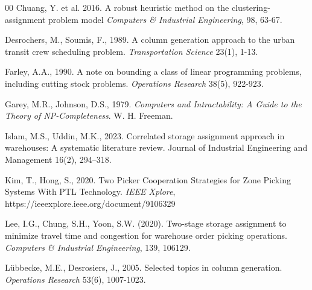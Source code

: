 \documentclass[preprint,review,11pt,authoryear]{elsarticle}
\begin{document}
\begin{thebibliography}{00}
Chuang, Y. et al. 2016. A robust heuristic method on the clustering-assignment problem model
\textit{Computers \& Industrial Engineering}, 98, 63-67.


Desrochers, M., Soumis, F., 1989. A column generation approach to the urban transit crew scheduling problem. \textit{Transportation Science} 23(1), 1-13.


Farley, A.A., 1990. A note on bounding a class of linear programming problems, including cutting stock problems. \textit{Operations Research} 38(5), 922-923.

Garey, M.R., Johnson, D.S., 1979. \textit{Computers and Intractability: A Guide to the Theory of NP-Completeness}. W. H. Freeman.

Islam, M.S., Uddin, M.K., 2023. Correlated storage assignment approach in warehouses: A systematic literature review. Journal of Industrial Engineering and Management 16(2), 294--318.

Kim, T., Hong, S., 2020. Two Picker Cooperation Strategies for Zone
Picking Systems With PTL Technology. \textit{IEEE Xplore}, https://ieeexplore.ieee.org/document/9106329

Lee, I.G., Chung, S.H., Yoon, S.W. (2020).
Two-stage storage assignment to minimize travel time and congestion for warehouse order picking operations.
\textit{Computers \& Industrial Engineering}, 139, 106129.


L{\"u}bbecke, M.E., Desrosiers, J., 2005. Selected topics in column generation.
\textit{Operations Research} 53(6), 1007-1023. 


\end{thebibliography}
\end{document}
